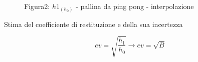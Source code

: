\documentclass[a4paper]{article}
\theoremstyle{definition}
\begin{document}
	
	\begin{figure}[!ht]
		\captionsetup{labelformat = empty}
	\caption{Figura2: \(h1_{(h_{0})}\) - pallina da ping pong - interpolazione}
	\end{figure}
	
\noindent Stima del coefficiente di restituzione e della sua incertezza

	\[ev = \sqrt{\frac{h_{1}}{h_{0}}} \rightarrow ev = \sqrt{B}\]
	
\end{document}
